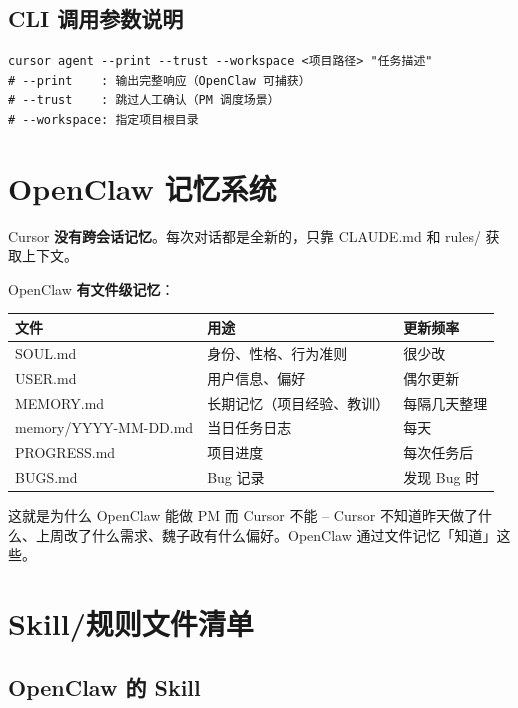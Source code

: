 \documentclass[11pt,a4paper]{article}
\begin{document}
\subsection{CLI 调用参数说明}

\begin{lstlisting}
cursor agent --print --trust --workspace <项目路径> "任务描述"
# --print    : 输出完整响应（OpenClaw 可捕获）
# --trust    : 跳过人工确认（PM 调度场景）
# --workspace: 指定项目根目录
\end{lstlisting}

\section{OpenClaw 记忆系统}

Cursor \textbf{没有跨会话记忆}。每次对话都是全新的，只靠 CLAUDE.md 和 rules/ 获取上下文。

OpenClaw \textbf{有文件级记忆}：

\begin{table}[h]
\centering
\begin{tabular}{lp{8cm}l}
\toprule
\textbf{文件} & \textbf{用途} & \textbf{更新频率} \\
\midrule
SOUL.md & 身份、性格、行为准则 & 很少改 \\
USER.md & 用户信息、偏好 & 偶尔更新 \\
MEMORY.md & 长期记忆（项目经验、教训） & 每隔几天整理 \\
memory/YYYY-MM-DD.md & 当日任务日志 & 每天 \\
PROGRESS.md & 项目进度 & 每次任务后 \\
BUGS.md & Bug 记录 & 发现 Bug 时 \\
\bottomrule
\end{tabular}
\end{table}

这就是为什么 OpenClaw 能做 PM 而 Cursor 不能 -- Cursor 不知道昨天做了什么、上周改了什么需求、魏子政有什么偏好。OpenClaw 通过文件记忆「知道」这些。

\section{Skill/规则文件清单}

\subsection{OpenClaw 的 Skill}
\end{document}
